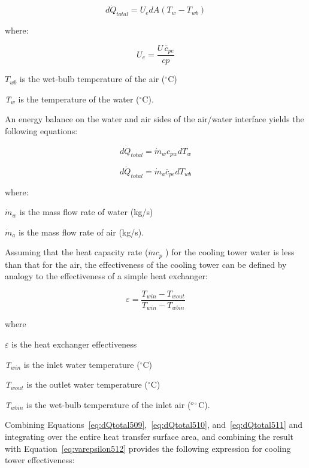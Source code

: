\begin{equation}
d{\dot Q_{total}} = U_e dA\left( {{T_w} - {T_{wb}}} \right)
\label{eq:dQtotal509}
\end{equation}

where:

\begin{equation}
U_e = \frac{{U\,\bar c_{pe}}}{{cp}}
\end{equation}

\(T_{wb}\) is the wet-bulb temperature of the air (\(^{\circ}\)C)

\emph{T\(_{w}\)} is the temperature of the water (\(^{\circ}\)C).

An energy balance on the water and air sides of the air/water interface yields the following equations:

\begin{equation}
d{\dot Q_{total}} = {\dot m_w} c_{pw} {dT_w}
\label{eq:dQtotal510}
\end{equation}

\begin{equation}
d{\dot Q_{total}} = {\dot m_a} \bar c_{pe} dT_{wb}
\label{eq:dQtotal511}
\end{equation}

where:

\({\dot m_w}\) is the mass flow rate of water (kg/s)

\({\dot m_a}\) is the mass flow rate of air (kg/s).

Assuming that the heat capacity rate (\(\dot mc_p\) ) for the cooling tower water is less than that for the air, the effectiveness of the cooling tower can be defined by analogy to the effectiveness of a simple heat exchanger:

\begin{equation}
\varepsilon  = \frac{{{T_{win}} - {T_{wout}}}}{{{T_{win}} - {T_{wbin}}}}
\label{eq:varepsilon512}
\end{equation}

where

\emph{\(\varepsilon\)} is the heat exchanger effectiveness

\emph{T\(_{win}\)} is the inlet water temperature (\(^{\circ}\)C)

\emph{T\(_{wout}\)} is the outlet water temperature (\(^{\circ}\)C)

\emph{T\(_{wbin}\)} is the wet-bulb temperature of the inlet air (\(^{o\circ}\)C).

Combining Equations~\ref{eq:dQtotal509},~\ref{eq:dQtotal510}, and~\ref{eq:dQtotal511} and integrating over the entire heat transfer surface area, and combining the result with Equation~\ref{eq:varepsilon512} provides the following expression for cooling tower effectiveness:

